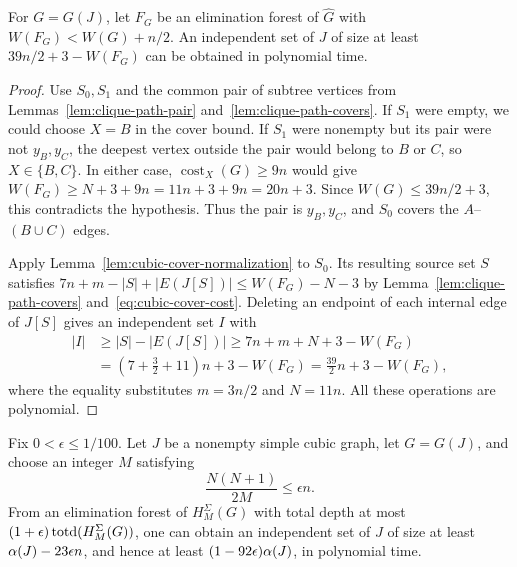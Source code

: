 \begin{lemma}
\label{lem:independent-set-from-forest}
For $G=G(J)$, let $F_G$ be an elimination forest of $\widehat G$ with
$W(F_G)<W(G)+n/2$. An independent set of $J$ of size at least
$39n/2+3-W(F_G)$ can be obtained in polynomial time.
\end{lemma}

\begin{proof}
Use $S_0,S_1$ and the common pair of subtree vertices from
Lemmas~\ref{lem:clique-path-pair} and~\ref{lem:clique-path-covers}.
If $S_1$ were empty, we could choose $X=B$ in the cover bound. If
$S_1$ were nonempty but its pair were not $y_B,y_C$, the deepest
vertex outside the pair would belong to $B$ or $C$, so $X\in\{B,C\}$.
In either case, $\operatorname{cost}_X(G)\ge9n$ would give
$W(F_G)\ge N+3+9n=11n+3+9n=20n+3$.
Since $W(G)\le39n/2+3$, this contradicts the hypothesis.
Thus the pair is $y_B,y_C$, and $S_0$ covers the
$A$--$(B\cup C)$ edges.

Apply Lemma~\ref{lem:cubic-cover-normalization} to $S_0$.
Its resulting source set $S$ satisfies
$7n+m-|S|+|E(J[S])|\le W(F_G)-N-3$ by
Lemma~\ref{lem:clique-path-covers} and~\eqref{eq:cubic-cover-cost}.
Deleting an endpoint of each internal edge of $J[S]$ gives an
independent set $I$ with
\[
\begin{aligned}
 |I|&\ge |S|-|E(J[S])|\ge 7n+m+N+3-W(F_G)\\
    &=(7+\tfrac32+11)n+3-W(F_G)=\tfrac{39}{2}n+3-W(F_G),
\end{aligned}
\]
where the equality substitutes $m=3n/2$ and $N=11n$. All these
operations are polynomial.
\end{proof}

\begin{lemma}
\label{lem:np-total-depth-extraction}
Fix $0<\epsilon\le1/100$. Let $J$ be a nonempty simple cubic
graph, let $G=G(J)$, and choose an integer $M$ satisfying
\begin{equation}\label{eq:np-total-depth-added-vertices-size}
 \frac{N(N+1)}{2M}\le\epsilon n.
\end{equation}
From an elimination forest of $H^{\Sigma}_M(G)$ with total depth at most
$(1+\epsilon)\operatorname{totd}(H^{\Sigma}_M(G))$, one can obtain an independent set of $J$
of size at least $\alpha(J)-23\epsilon n$, and hence at least
$(1-92\epsilon)\alpha(J)$, in polynomial time.
\end{lemma}

